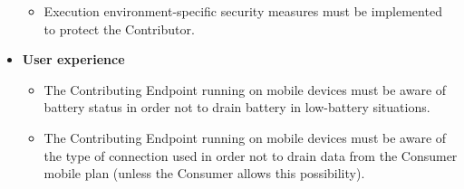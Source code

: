 \begin{itemize}
\begin{itemize}
        \item Execution environment-specific security measures must be implemented to protect the Contributor.
    \end{itemize}
    \item \textbf{User experience}
    \begin{itemize}
        \item The Contributing Endpoint running on mobile devices must be aware of battery status in order not to drain battery in low-battery situations.
        \item The Contributing Endpoint running on mobile devices must be aware of the type of connection used in order not to drain data from the Consumer mobile plan (unless the Consumer allows this possibility).
    \end{itemize}
\end{itemize}
